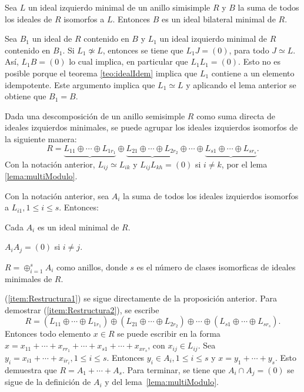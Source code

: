\begin{proposicion}
Sea $L$ un ideal izquierdo minimal de un anillo simisimple $R$ y $B$ la suma de todos los ideales de $R$ isomorfos a $L$. Entonces $B$ es un ideal bilateral minimal de $R$.
\end{proposicion}
\begin{proof*}
Sea $B_1$ un ideal de $R$ contenido en $B$ y $L_1$ un ideal izquierdo minimal de $R$ contenido en $B_1$. Si $L_1 \not\simeq L$, entonces se tiene que $L_1J = (0)$, para todo $J \simeq L$. Así, $L_1B = (0)$ lo cual implica, en particular que $L_1L_1 = (0)$. Esto no es posible porque el teorema \ref{teo:idealIdem}  implica que $L_1$ contiene a un elemento idempotente. Este argumento implica que $L_1 \simeq L$ y aplicando  el lema anterior se obtiene que $B_1 = B$. 
\end{proof*}
Dada una descomposición de un anillo semisimple $R$ como suma directa de ideales izquierdos minimales, se puede agrupar los ideales izquierdos isomorfos de la siguiente manera:
\[ R = \underbrace{L_{11}\oplus \cdots \oplus L_{1r_1}} \oplus \underbrace{L_{21}\oplus \cdots \oplus L_{2r_2}} \oplus \cdots  \oplus \underbrace{L_{s1}\oplus \cdots \oplus L_{sr_s}}. \]
Con la notación anterior, $L_{ij} \simeq L_{ik}$ y $L_{ij}L_{kh} = (0)$ si $i \neq k$, por el lema \ref{lema:multiModulo}. 
\begin{teorema}
Con la notación anterior, sea $A_i$ la suma de todos los ideales izquierdos isomorfos a $L_{i1}, 1\leq i \leq s$. Entonces:
\begin{bulletList}
\item\label{item:Restructura1} Cada $A_i$ es un ideal minimal de $R$.
\item\label{item:Restructura2} $A_iA_j = (0)$ si $i \neq j$.
\item\label{item:Restructura3} $R = \oplus_{i=1}^{s}A_i$ como anillos, donde $s$ es el número de clases isomorficas de ideales minimales de $R$.
\end{bulletList}
\end{teorema}
\begin{proof*}
(\ref{item:Restructura1}) se sigue directamente de la proposición anterior. Para demostrar (\ref{item:Restructura2}), se escribe \[ R = (L_{11}\oplus \cdots \oplus L_{1r_1}) \oplus (L_{21}\oplus \cdots \oplus L_{2r_2}) \oplus \cdots  \oplus (L_{s1}\oplus \cdots \oplus L_{sr_s}). \]Entonces todo elemento $x \in R$ se puede escribir en la forma $x = x_{11} + \cdots + x_{rr_1} + \cdots + x_{s1} +\cdots +x_{xr_s}$, con $x_{ij} \in L_{ij}$. Sea $y_i = x_{i1} + \cdots + x_{ir_i}, 1\leq i \leq s$. Entonces $y_i \in A_i, 1\leq i \leq s$ y $x = y_1 + \cdots + y_s$. Esto demuestra que $R = A_1 + \cdots + A_s$. Para terminar, se tiene que $A_i\cap A_j = (0)$ se sigue de la definición de $A_i$ y del lema~\ref{lema:multiModulo}. 
\end{proof*}
